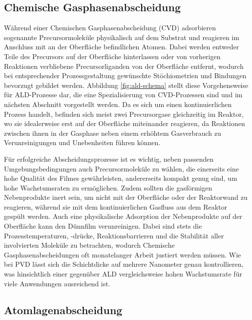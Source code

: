 \subsection{Chemische Gasphasenabscheidung}

Während einer Chemischen Gasphasenabscheidung (CVD) adsorbieren sogenannte Precursormoleküle physikalisch auf dem Substrat und reagieren im Anschluss mit an der Oberfläche befindlichen Atomen.
Dabei werden entweder Teile des Precursors auf der Oberfläche hinterlassen oder von vorherigen Reaktionen verbliebene Precursorliganden von der Oberfläche entfernt, wodurch bei entsprechender Prozessgestaltung gewünschte Stöchiometrien und Bindungen bevorzugt gebildet werden.
Abbildung \ref{fig:ald-schema} stellt diese Vorgehensweise für ALD-Prozesse dar, die eine Spezialisierung von CVD-Prozessen sind und im nächsten Abschnitt vorgestellt werden.
Da es sich um einen kontinuierlichen Prozess handelt, befinden sich meist zwei Precursorgase gleichzeitig im Reaktor, wo sie idealerweise erst auf der Oberfläche miteinander reagieren, da Reaktionen zwischen ihnen in der Gasphase neben einem erhöhtem Gasverbrauch zu Verunreinigungen und Unebenheiten führen können.

Für erfolgreiche Abscheidungsprozesse ist es wichtig, neben passenden Umgebungsbedingungen auch Precursormoleküle zu wählen, die einerseits eine hohe Qualität des Filmes gewährleisten, andererseits kompakt genug sind, um hohe Wachstumsraten zu ermöglichen.
Zudem sollten die gasförmigen Nebenprodukte inert sein, um nicht mit der Oberfläche oder der Reaktorwand zu reagieren, während sie mit dem kontinuierlichen Gasfluss aus dem Reaktor gespült werden.
Auch eine physikalische Adsorption der Nebenprodukte auf der Oberfläche kann den Dünnfilm verunreinigen.
Dabei sind stets die Prozesstemperaturen, -drücke, Reaktionsbarrieren und die Stabilität aller involvierten Moleküle zu betrachten, wodurch Chemische Gasphasenabscheidungen oft monatelanger Arbeit justiert werden müssen.
Wie bei PVD lässt sich die Schichtdicke auf mehrere Nanometer genau kontrollieren, was hinsichtlich einer gegenüber ALD vergleichsweise hohen Wachstumsrate für viele Anwendungen ausreichend ist.


\subsection{Atomlagenabscheidung}

